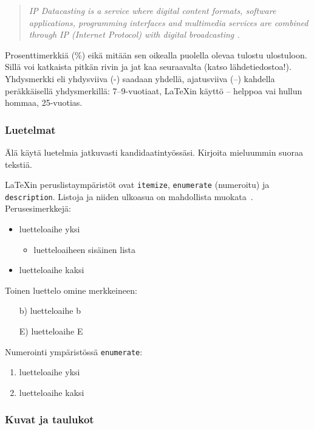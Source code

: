 \begin{quotation} { 
\noindent \it
IP Datacasting is a service where digital content formats, software
applications, programming interfaces and multimedia services are
combined through IP (Internet Protocol) with digital
broadcasting \citep{RefWorks:doc:601937178f0884cb02a8458c}. } 
\end{quotation}

Prosenttimerkkiä (\%) eikä mitään sen oikealla puolella olevaa tulostu
ulostuloon. Sillä voi katkaista pitkän rivin ja jat%
kaa seuraavalta (katso lähdetiedostoa!).  Yhdysmerkki eli yhdysviiva
(-) saadaan yhdellä, ajatusviiva (--) kahdella peräkkäisellä
yhdysmerkillä: 7--9-vuotiaat, LaTeXin käyttö -- helppoa vai hullun
hommaa, 25-vuotias.

\subsubsection{Luetelmat}
\label{sec:esimluettelo}

Älä käytä luetelmia jatkuvasti kandidaatintyössäsi. Kirjoita
mieluummin suoraa tekstiä.

\LaTeX{}in peruslistaympäristöt ovat \verb!itemize!, 
\verb!enumerate! (numeroitu)
ja \verb!description!. Listoja ja niiden ulkoasua on
mahdollista muokata~\citep[katso esim.][s. 128]{RefWorks:doc:601937178f0884cb02a8458c}. 
Perusesimerkkejä:
%
\begin{itemize}
\item luetteloaihe yksi
 \begin{itemize}
 \item luetteloaiheen sisäinen lista
 \end{itemize}
\item luetteloaihe kaksi
\end{itemize}

Toinen luettelo omine merkkeineen:
%
\begin{itemize}
\item[b)] luetteloaihe b
\item[E)] luetteloaihe E
\end{itemize}

Numerointi ympäristössä \verb!enumerate!:
%
\begin{enumerate}
\item luetteloaihe yksi
\item luetteloaihe kaksi
\end{enumerate}

\subsubsection{Kuvat ja taulukot}
\label{sec:esimviitteet}

